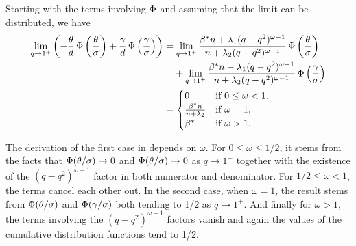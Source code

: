 Starting with the terms involving \(\operatorname{\Phi}\) and assuming that the limit can be distributed,
we have
\begin{align}
  \lim_{q \rightarrow 1^+} \left(-\frac{\theta}{d} \cdf\left(\frac{\theta}{\sigma}\right) + \frac{\gamma}{d} \cdf \left(\frac{\gamma}{\sigma}\right)\right)
   & = \lim_{q\rightarrow 1^+} \frac{\beta^* n + \lambda_1(q-q^2)^{\omega -1}}{n + \lambda_2(q-q^2)^{\omega - 1}}\cdf\left(\frac{\theta}{\sigma}\right) \nonumber                \\
   & \phantom{= {}} + \lim_{q\rightarrow 1^+} \frac{\beta^* n - \lambda_1(q-q^2)^{\omega -1}}{n + \lambda_2(q-q^2)^{\omega - 1}}\cdf\left(\frac{\gamma}{\sigma}\right) \nonumber \\
   & =\begin{cases}
        0                              & \text{if } 0 \leq \omega < 1, \\
        \frac{\beta^*n}{n + \lambda_2} & \text{if } \omega = 1,        \\
        \beta^*                        & \text{if } \omega > 1.
      \end{cases} \label{eq:eval-qlimit-terms-weighted}
\end{align}

The derivation of the first case in  depends on
\(\omega\). For \(0 \leq \omega \leq 1/2\), it stems from the facts that
\(\operatorname{\Phi}(\theta/\sigma) \rightarrow 0\) and \(\operatorname{\Phi}(\theta/\sigma) \rightarrow 0\) as \(q
\rightarrow 1^+\) together with the existence of the \((q-q^2)^{\omega - 1}\) factor in
both numerator and denominator. For \(1/2 \leq \omega < 1\), the terms cancel each other
out. In the second case, when \(\omega = 1\), the result stems from \(\operatorname{\Phi}(\theta/\sigma)\)
and \(\operatorname{\Phi}(\gamma/\sigma)\) both tending to 1/2 as \(q \rightarrow 1^+\). And finally for
\(\omega > 1\), the terms involving the \((q-q^2)^{\omega - 1}\) factors vanish and again
the values of the cumulative distribution functions tend to 1/2.

